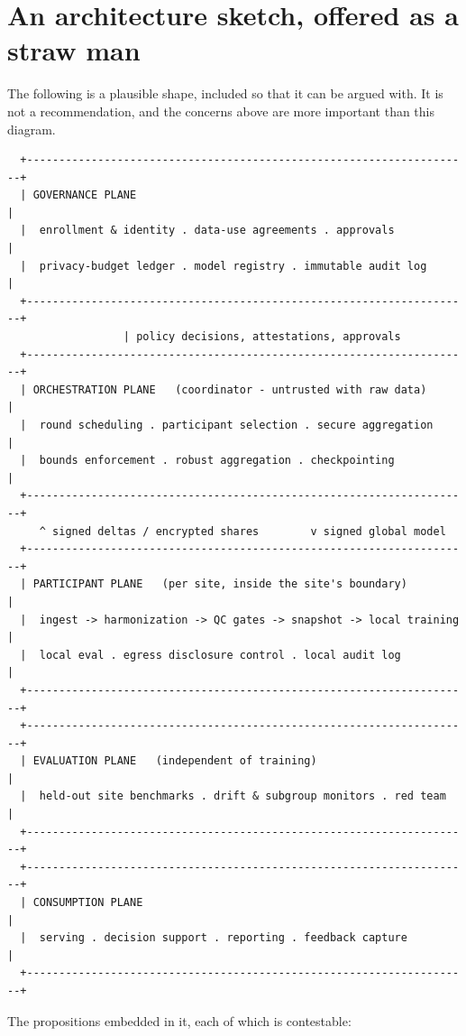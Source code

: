 \documentclass[11pt,a4paper]{article}
\begin{document}
\section{An architecture sketch, offered as a straw man}
\label{sec:architecture}

The following is a plausible shape, included so that it can be argued with.
It is not a recommendation, and the concerns above are more important than
this diagram.

\begin{verbatim}
  +---------------------------------------------------------------------+
  | GOVERNANCE PLANE                                                    |
  |  enrollment & identity . data-use agreements . approvals            |
  |  privacy-budget ledger . model registry . immutable audit log       |
  +---------------------------------------------------------------------+
                  | policy decisions, attestations, approvals
  +---------------------------------------------------------------------+
  | ORCHESTRATION PLANE   (coordinator - untrusted with raw data)       |
  |  round scheduling . participant selection . secure aggregation      |
  |  bounds enforcement . robust aggregation . checkpointing            |
  +---------------------------------------------------------------------+
     ^ signed deltas / encrypted shares        v signed global model
  +---------------------------------------------------------------------+
  | PARTICIPANT PLANE   (per site, inside the site's boundary)          |
  |  ingest -> harmonization -> QC gates -> snapshot -> local training  |
  |  local eval . egress disclosure control . local audit log           |
  +---------------------------------------------------------------------+
  +---------------------------------------------------------------------+
  | EVALUATION PLANE   (independent of training)                        |
  |  held-out site benchmarks . drift & subgroup monitors . red team     |
  +---------------------------------------------------------------------+
  +---------------------------------------------------------------------+
  | CONSUMPTION PLANE                                                   |
  |  serving . decision support . reporting . feedback capture          |
  +---------------------------------------------------------------------+
\end{verbatim}

The propositions embedded in it, each of which is contestable:
\end{document}
